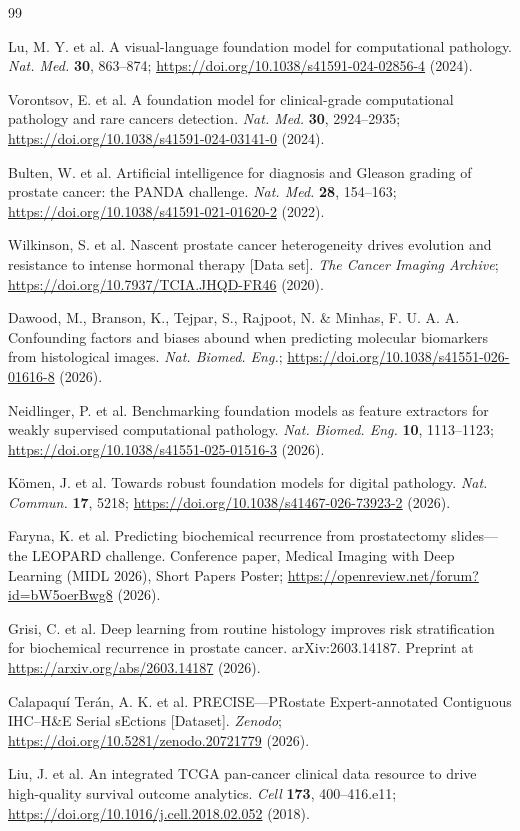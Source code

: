 \begin{thebibliography}{99}

 Lu, M. Y. et al. A visual-language foundation model for
computational pathology. \textit{Nat. Med.} \textbf{30}, 863--874;
\url{https://doi.org/10.1038/s41591-024-02856-4} (2024).

 Vorontsov, E. et al. A foundation model for clinical-grade
computational pathology and rare cancers detection. \textit{Nat. Med.} \textbf{30},
2924--2935; \url{https://doi.org/10.1038/s41591-024-03141-0} (2024).

 Bulten, W. et al. Artificial intelligence for diagnosis and
Gleason grading of prostate cancer: the PANDA challenge. \textit{Nat. Med.}
\textbf{28}, 154--163; \url{https://doi.org/10.1038/s41591-021-01620-2} (2022).

 Wilkinson, S. et al. Nascent prostate cancer heterogeneity
drives evolution and resistance to intense hormonal therapy [Data set].
\textit{The Cancer Imaging Archive};
\url{https://doi.org/10.7937/TCIA.JHQD-FR46} (2020).

 Dawood, M., Branson, K., Tejpar, S., Rajpoot, N. \& Minhas,
F. U. A. A. Confounding factors and biases abound when predicting molecular biomarkers
from histological images. \textit{Nat. Biomed. Eng.};
\url{https://doi.org/10.1038/s41551-026-01616-8} (2026).

 Neidlinger, P. et al. Benchmarking foundation models as
feature extractors for weakly supervised computational pathology. \textit{Nat. Biomed.
Eng.} \textbf{10}, 1113--1123;
\url{https://doi.org/10.1038/s41551-025-01516-3} (2026).

 K\"omen, J. et al. Towards robust foundation models for
digital pathology. \textit{Nat. Commun.} \textbf{17}, 5218;
\url{https://doi.org/10.1038/s41467-026-73923-2} (2026).

 Faryna, K. et al. Predicting biochemical recurrence from
prostatectomy slides---the LEOPARD challenge. Conference paper, Medical Imaging with
Deep Learning (MIDL 2026), Short Papers Poster;
\url{https://openreview.net/forum?id=bW5oerBwg8} (2026).

 Grisi, C. et al. Deep learning from routine histology improves
risk stratification for biochemical recurrence in prostate cancer. arXiv:2603.14187.
Preprint at \url{https://arxiv.org/abs/2603.14187} (2026).

 Calapaqu\'i Ter\'an, A. K. et al. PRECISE---PRostate
Expert-annotated Contiguous IHC--H\&E Serial sEctions [Dataset]. \textit{Zenodo};
\url{https://doi.org/10.5281/zenodo.20721779} (2026).

 Liu, J. et al. An integrated TCGA pan-cancer clinical data
resource to drive high-quality survival outcome analytics. \textit{Cell} \textbf{173},
400--416.e11; \url{https://doi.org/10.1016/j.cell.2018.02.052} (2018).

\end{thebibliography}
